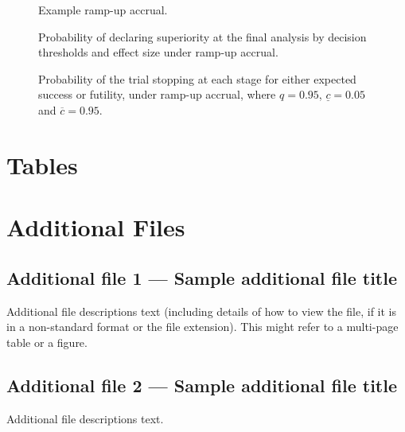 \documentclass{bmcart}
\begin{document}
\begin{backmatter}
\begin{figure}[h!] 	  	  	  
	\caption{Example ramp-up accrual.}
	\label{fig:accrual-ru}
\end{figure}

\begin{figure}[h!]
	\caption{Probability of declaring superiority at the final analysis by decision thresholds and effect size under ramp-up accrual.}
	\label{fig:decisions-ru}
\end{figure}

\begin{figure}[h!]
	\caption{Probability of the trial stopping at each stage for either expected success or futility, under ramp-up accrual, where \(q=0.95\), \(\underline{c}=0.05\) and \(\overline{c}=0.95\).}\label{fig:stop-ru}
\end{figure}


\section*{Tables}









\section*{Additional Files}
  \subsection*{Additional file 1 --- Sample additional file title}
    Additional file descriptions text (including details of how to
    view the file, if it is in a non-standard format or the file extension).  This might
    refer to a multi-page table or a figure.

  \subsection*{Additional file 2 --- Sample additional file title}
    Additional file descriptions text.

\end{backmatter}
\end{document}
